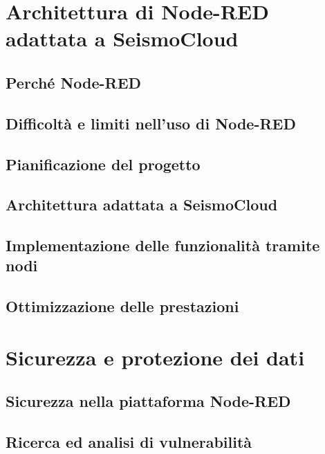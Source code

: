 \documentclass[a4paper,10pt]{memoir}
\begin{document}
\chapter{Architettura di Node-RED adattata a SeismoCloud}

\section{Perché Node-RED}

\section{Difficoltà e limiti nell'uso di Node-RED}

\section{Pianificazione del progetto}

\section{Architettura adattata a SeismoCloud}

\section{Implementazione delle funzionalità tramite nodi}

\section{Ottimizzazione delle prestazioni}


\chapter{Sicurezza e protezione dei dati}

\section{Sicurezza nella piattaforma Node-RED}

\section{Ricerca ed analisi di vulnerabilità}
\end{document}

